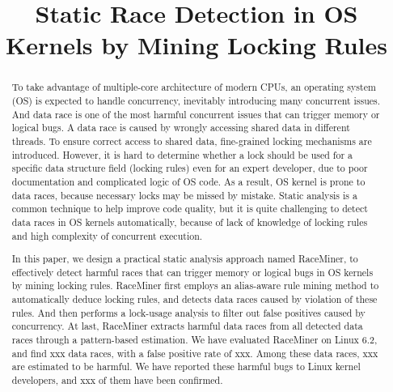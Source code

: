 \documentclass[pageno]{jpaper}
\newcommand{\sys}{\mbox{RaceMiner}\xspace}
\begin{document}
\title{
Static Race Detection in OS Kernels by Mining Locking Rules}

\date{}
\maketitle

\thispagestyle{empty}

\begin{abstract}
	
To take advantage of multiple-core architecture of modern CPUs, an operating 
system (OS) is expected to handle concurrency, inevitably introducing many 
concurrent issues. And data race is one of the most harmful concurrent issues 
that can trigger memory or logical bugs. A data race is caused by wrongly 
accessing shared data in different threads. To ensure correct access to shared 
data, fine-grained locking mechanisms are introduced. However, it is hard to 
determine whether a lock should be used for a specific data structure field 
(locking rules) even for an expert developer, due to poor documentation and 
complicated logic of OS code. As a result, OS kernel is prone to data races, 
because necessary locks may be missed by mistake. Static analysis is a common 
technique to help improve code quality, but it is quite challenging to detect 
data races in OS kernels automatically, because of lack of knowledge of locking 
rules and high complexity of concurrent execution.

In this paper, we design a practical static analysis approach named \sys, to 
effectively detect harmful races that can trigger memory or logical bugs in OS 
kernels by mining locking rules. \sys first employs an alias-aware rule mining 
method to automatically deduce locking rules, and detects data races caused by 
violation of these rules. And then performs a lock-usage analysis to filter out 
false positives caused by concurrency. At last, \sys extracts harmful data 
races from all detected data races through a pattern-based estimation. We have 
evaluated \sys on Linux 6.2, and find xxx data races, with a false positive 
rate of xxx. Among these data races, xxx are estimated to be harmful. We have 
reported these harmful bugs to Linux kernel developers, and xxx of them have 
been confirmed.

\end{abstract}










\footnotesize


\end{document}
